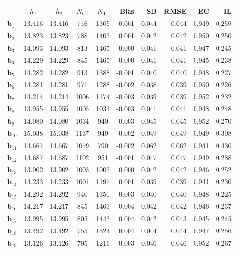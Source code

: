 \documentclass[10pt]{article}
\newcommand{\bb}{\mathbf{b}}
\begin{document}
\begin{table}[p]
    \centering
\begin{tabular}{lccccrrrrr}
\toprule\toprule
 & $h_1$ & $h_2$ & $N_{\mathrm{Co}}$ & $N_{\mathrm{Tr}}$ & Bias & SD & RMSE & EC & IL \\
\midrule
$\bb_{1}$ & 13.416 & 13.416 & 746 & 1305 & 0.001 & 0.044 & 0.044 & 0.949 & 0.259 \\
$\bb_{2}$ & 13.823 & 13.823 & 788 & 1403 & 0.001 & 0.042 & 0.042 & 0.950 & 0.250 \\
$\bb_{3}$ & 14.093 & 14.093 & 813 & 1465 & 0.000 & 0.041 & 0.041 & 0.947 & 0.245 \\
$\bb_{4}$ & 14.229 & 14.229 & 845 & 1465 & -0.000 & 0.041 & 0.041 & 0.945 & 0.238 \\
$\bb_{5}$ & 14.282 & 14.282 & 913 & 1388 & -0.001 & 0.040 & 0.040 & 0.948 & 0.227 \\
$\bb_{6}$ & 14.281 & 14.281 & 971 & 1288 & -0.002 & 0.038 & 0.039 & 0.950 & 0.226 \\
$\bb_{7}$ & 14.214 & 14.214 & 1006 & 1174 & -0.003 & 0.039 & 0.039 & 0.952 & 0.232 \\
$\bb_{8}$ & 13.955 & 13.955 & 1005 & 1031 & -0.003 & 0.041 & 0.041 & 0.948 & 0.248 \\
$\bb_{9}$ & 14.080 & 14.080 & 1034 & 940 & -0.003 & 0.045 & 0.045 & 0.952 & 0.270 \\
$\bb_{10}$ & 15.038 & 15.038 & 1137 & 949 & -0.002 & 0.049 & 0.049 & 0.949 & 0.308 \\
$\bb_{11}$ & 14.667 & 14.667 & 1079 & 790 & -0.002 & 0.062 & 0.062 & 0.941 & 0.430 \\
$\bb_{12}$ & 14.687 & 14.687 & 1102 & 951 & -0.001 & 0.047 & 0.047 & 0.949 & 0.288 \\
$\bb_{13}$ & 13.902 & 13.902 & 1003 & 1003 & 0.000 & 0.042 & 0.042 & 0.946 & 0.252 \\
$\bb_{14}$ & 14.233 & 14.233 & 1001 & 1197 & 0.001 & 0.039 & 0.039 & 0.941 & 0.230 \\
$\bb_{15}$ & 14.292 & 14.292 & 940 & 1350 & 0.003 & 0.040 & 0.040 & 0.948 & 0.225 \\
$\bb_{16}$ & 14.217 & 14.217 & 845 & 1463 & 0.004 & 0.042 & 0.042 & 0.946 & 0.237 \\
$\bb_{17}$ & 13.995 & 13.995 & 805 & 1443 & 0.004 & 0.042 & 0.043 & 0.945 & 0.245 \\
$\bb_{18}$ & 13.492 & 13.492 & 755 & 1324 & 0.004 & 0.044 & 0.044 & 0.947 & 0.256 \\
$\bb_{19}$ & 13.126 & 13.126 & 705 & 1216 & 0.003 & 0.046 & 0.046 & 0.952 & 0.267 \\

\end{tabular}
\end{table}
\end{document}
